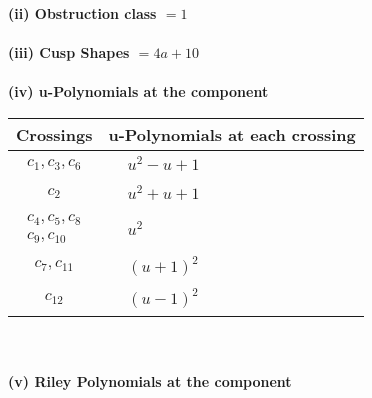 \documentclass[1p]{elsarticle_modified}
\theoremstyle{definition}
\begin{document}
\flushleft \textbf{(ii) Obstruction class $= 1$}\\~\\
\flushleft \textbf{(iii) Cusp Shapes $= 4 a+10$}\\~\\
\newpage\renewcommand{\arraystretch}{1}
\flushleft \textbf{(iv) u-Polynomials at the component}\newline \\
\begin{tabular}{m{50pt}|m{274pt}}
Crossings & \hspace{64pt}u-Polynomials at each crossing \\
\hline $$\begin{aligned}c_{1},c_{3},c_{6}\end{aligned}$$&$\begin{aligned}
&u^2- u+1
\end{aligned}$\\
\hline $$\begin{aligned}c_{2}\end{aligned}$$&$\begin{aligned}
&u^2+u+1
\end{aligned}$\\
\hline $$\begin{aligned}c_{4},c_{5},c_{8}\\c_{9},c_{10}\end{aligned}$$&$\begin{aligned}
&u^2
\end{aligned}$\\
\hline $$\begin{aligned}c_{7},c_{11}\end{aligned}$$&$\begin{aligned}
&(u+1)^2
\end{aligned}$\\
\hline $$\begin{aligned}c_{12}\end{aligned}$$&$\begin{aligned}
&(u-1)^2
\end{aligned}$\\
\hline
\end{tabular}\\~\\
\newpage\renewcommand{\arraystretch}{1}
\flushleft \textbf{(v) Riley Polynomials at the component}\newline \\
\end{document}

